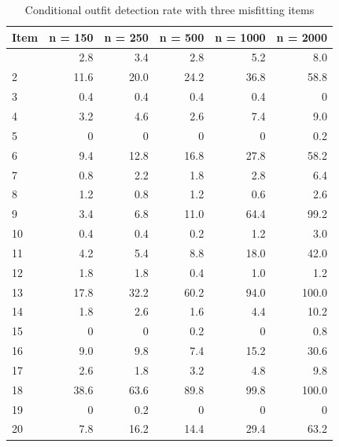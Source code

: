 \documentclass[
  letterpaper,
  DIV=11,
  numbers=noendperiod]{scrartcl}
\begin{document}
\begin{longtable}[]{@{}lrrrrr@{}}

\caption{\label{tbl-ifb3out}Conditional outfit detection rate with three
misfitting items}

\tabularnewline

\toprule\noalign{}
Item & n = 150 & n = 250 & n = 500 & n = 1000 & n = 2000 \\
\midrule\noalign{}
\endhead
\bottomrule\noalign{}
\endlastfoot
1 & 2.8 & 3.4 & 2.8 & 5.2 & 8.0 \\
2 & 11.6 & 20.0 & 24.2 & 36.8 & 58.8 \\
3 & 0.4 & 0.4 & 0.4 & 0.4 & 0 \\
4 & 3.2 & 4.6 & 2.6 & 7.4 & 9.0 \\
5 & 0 & 0 & 0 & 0 & 0.2 \\
6 & 9.4 & 12.8 & 16.8 & 27.8 & 58.2 \\
7 & 0.8 & 2.2 & 1.8 & 2.8 & 6.4 \\
8 & 1.2 & 0.8 & 1.2 & 0.6 & 2.6 \\
9 & 3.4 & 6.8 & 11.0 & 64.4 & 99.2 \\
10 & 0.4 & 0.4 & 0.2 & 1.2 & 3.0 \\
11 & 4.2 & 5.4 & 8.8 & 18.0 & 42.0 \\
12 & 1.8 & 1.8 & 0.4 & 1.0 & 1.2 \\
13 & 17.8 & 32.2 & 60.2 & 94.0 & 100.0 \\
14 & 1.8 & 2.6 & 1.6 & 4.4 & 10.2 \\
15 & 0 & 0 & 0.2 & 0 & 0.8 \\
16 & 9.0 & 9.8 & 7.4 & 15.2 & 30.6 \\
17 & 2.6 & 1.8 & 3.2 & 4.8 & 9.8 \\
18 & 38.6 & 63.6 & 89.8 & 99.8 & 100.0 \\
19 & 0 & 0.2 & 0 & 0 & 0 \\
20 & 7.8 & 16.2 & 14.4 & 29.4 & 63.2 \\

\end{longtable}
\end{document}
